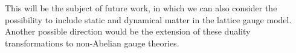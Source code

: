 This will be the subject of future work, in which we can also consider the possibility to include static and dynamical matter in the lattice gauge model.
Another possible direction would be the extension of these duality transformations to non-Abelian gauge theories.




